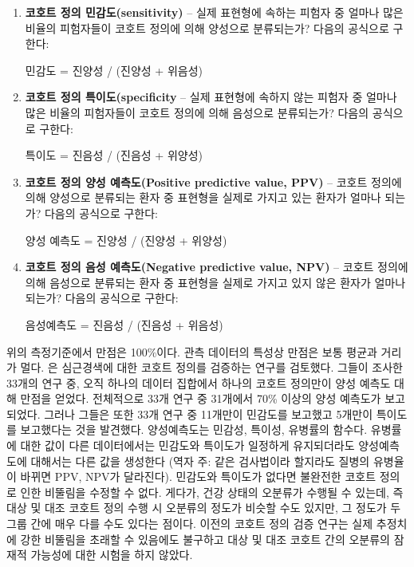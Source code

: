 \documentclass[10.5pt]{book}
\theoremstyle{definition}
\theoremstyle{definition}
\theoremstyle{definition}
\theoremstyle{remark}
\begin{document}
\begin{enumerate}
\def\labelenumi{\arabic{enumi}.}
\item
  \textbf{코호트 정의 민감도(sensitivity)} -- 실제 표현형에 속하는
  피험자 중 얼마나 많은 비율의 피험자들이 코호트 정의에 의해 양성으로
  분류되는가? 다음의 공식으로 구한다:

  민감도 = 진양성 / (진양성 + 위음성)
\item
  \textbf{코호트 정의 특이도(specificity} -- 실제 표현형에 속하지 않는
  피험자 중 얼마나 많은 비율의 피험자들이 코호트 정의에 의해 음성으로
  분류되는가? 다음의 공식으로 구한다:

  특이도 = 진음성 / (진음성 + 위양성)
\item
  \textbf{코호트 정의 양성 예측도(Positive predictive value, PPV)} --
  코호트 정의에 의해 양성으로 분류되는 환자 중 표현형을 실제로 가지고
  있는 환자가 얼마나 되는가? 다음의 공식으로 구한다:

  양성 예측도 = 진양성 / (진양성 + 위양성)
\item
  \textbf{코호트 정의 음성 예측도(Negative predictive value, NPV)} --
  코호트 정의에 의해 음성으로 분류되는 환자 중 표현형을 실제로 가지고
  있지 않은 환자가 얼마나 되는가? 다음의 공식으로 구한다:

  음성예측도 = 진음성 / (진음성 + 위음성)
\end{enumerate}

위의 측정기준에서 만점은 100\%이다. 관측 데이터의 특성상 만점은 보통
평균과 거리가 멀다. \citet{Rubbo2015phenotypes} 은 심근경색에 대한
코호트 정의를 검증하는 연구를 검토했다. 그들이 조사한 33개의 연구 중,
오직 하나의 데이터 집합에서 하나의 코호트 정의만이 양성 예측도 대해
만점을 얻었다. 전체적으로 33개 연구 중 31개에서 70\% 이상의 양성
예측도가 보고되었다. 그러나 그들은 또한 33개 연구 중 11개만이 민감도를
보고했고 5개만이 특이도를 보고했다는 것을 발견했다. 양성예측도는 민감성,
특이성, 유병률의 함수다. 유병률에 대한 값이 다른 데이터에서는 민감도와
특이도가 일정하게 유지되더라도 양성예측도에 대해서는 다른 값을 생성한다
(역자 주: 같은 검사법이라 할지라도 질병의 유병율이 바뀌면 PPV, NPV가
달라진다). 민감도와 특이도가 없다면 불완전한 코호트 정의로 인한 비뚤림을
수정할 수 없다. 게다가, 건강 상태의 오분류가 수행될 수 있는데, 즉 대상
및 대조 코호트 정의 수행 시 오분류의 정도가 비슷할 수도 있지만, 그
정도가 두 그룹 간에 매우 다를 수도 있다는 점이다. 이전의 코호트 정의
검증 연구는 실제 추정치에 강한 비뚤림을 초래할 수 있음에도 불구하고 대상
및 대조 코호트 간의 오분류의 잠재적 가능성에 대한 시험을 하지 않았다.
\end{document}
